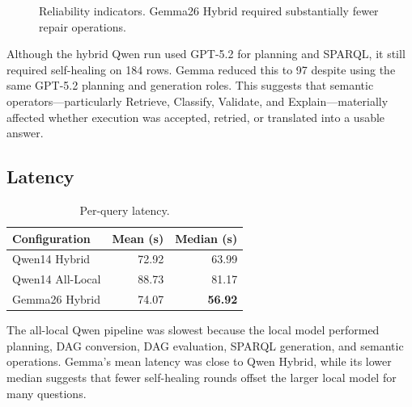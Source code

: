 \documentclass[11pt]{article}
\begin{document}
\begin{figure}[H]
\centering
{}
\caption{Reliability indicators. Gemma26 Hybrid required substantially fewer repair operations.}
\label{fig:reliability}
\end{figure}

Although the hybrid Qwen run used GPT-5.2 for planning and SPARQL, it still required self-healing on 184 rows. Gemma reduced this to 97 despite using the same GPT-5.2 planning and generation roles. This suggests that semantic operators---particularly Retrieve, Classify, Validate, and Explain---materially affected whether execution was accepted, retried, or translated into a usable answer.

\subsection{Latency}

\begin{table}[H]
\centering
\caption{Per-query latency.}
\label{tab:latency}
\begin{tabular}{lrr}
\toprule
\textbf{Configuration} & \textbf{Mean (s)} & \textbf{Median (s)}\\
\midrule
Qwen14 Hybrid & 72.92 & 63.99\\
Qwen14 All-Local & 88.73 & 81.17\\
Gemma26 Hybrid & 74.07 & \textbf{56.92}\\
\bottomrule
\end{tabular}
\end{table}

The all-local Qwen pipeline was slowest because the local model performed planning, DAG conversion, DAG evaluation, SPARQL generation, and semantic operations. Gemma's mean latency was close to Qwen Hybrid, while its lower median suggests that fewer self-healing rounds offset the larger local model for many questions.
\end{document}
